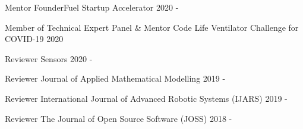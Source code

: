 \begin{cvhonors}

\cvhonor
{Mentor}
{FounderFuel Startup Accelerator}
{}
{2020 - }

\cvhonor
{Member of Technical Expert Panel \& Mentor}
{Code Life Ventilator Challenge for COVID-19}
{}
{2020}

\cvhonor
{Reviewer}
{Sensors}
{}
{2020 - }

\cvhonor
{Reviewer}
{Journal of Applied Mathematical Modelling}
{}
{2019 - }

\cvhonor
{Reviewer}
{International Journal of Advanced Robotic Systems (IJARS)}
{}
{2019 - }

\cvhonor
{Reviewer}
{The Journal of Open Source Software (JOSS)}
{}
{2018 - }





\end{cvhonors}
